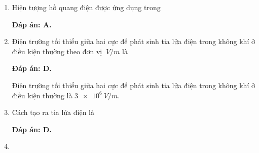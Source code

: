 \begin{enumerate}[label=\bfseries Câu \arabic*:]
{		Hồ quang điện là quá trình phóng điện tự lực trong chất khí ở áp suất thường hoặc áp suất thấp đặt giữa hai điện cực có hiệu điện thế không lớn.
	}
	\item {}
	
	\cauhoi
	{Hiện tượng hồ quang điện được ứng dụng trong
		
	}
	\loigiai
	{	\textbf{Đáp án: A.}
		
	}
	\item {}
	
	\cauhoi
	{Điện trường tối thiểu giữa hai cực để phát sinh tia lửa điện trong không khí ở điều kiện thường theo đơn vị $\SI{}{V/m}$ là
		
	}
	\loigiai
	{	\textbf{Đáp án: D.}
		
		Điện trường tối thiểu giữa hai cực để phát sinh tia lửa điện trong không khí ở điều kiện thường là $\SI{3e6}{V/m}$.
	}
	\item {}
	
	\cauhoi
	{Cách tạo ra tia lửa điện là
		
	}
	\loigiai
	{	\textbf{Đáp án: D.}
		
	}
	\item {}
	

\end{enumerate}
